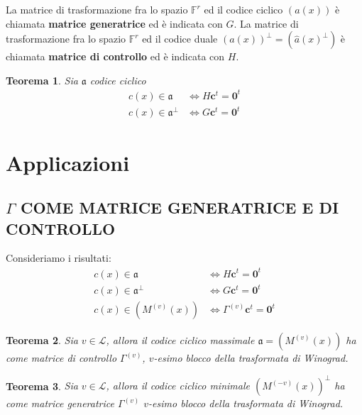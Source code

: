 \documentclass[mathserif]{beamer}
\newtheorem{teorema}{Teorema}
\begin{document}

\begin{frame}
  La matrice di trasformazione fra lo spazio $\mathbb{F}^{r}$ ed il codice ciclico $(a(x))$ è chiamata {\bf matrice generatrice} ed è indicata con $G$. 
  La matrice di trasformazione fra lo spazio $\mathbb{F}^{r}$ ed il codice duale $(a(x))^{\perp} = (\hat{a}(x)^{\perp})$ è chiamata {\bf matrice di controllo} ed è indicata con $H$.
  \begin{teorema}
     Sia $\mathfrak{a} $ codice ciclico 
     \begin{align*}
	c(x) \in \mathfrak{a} &\iff H \mathbf{c}^{t} = \mathbf{0}^{t}  \\
	c(x) \in \mathfrak{a}^{\perp} &\iff G \mathbf{c}^{t} = \mathbf{0}^{t} 
      \end{align*}
  \end{teorema}
\end{frame}


\section{Applicazioni}
\subsection{$\Gamma$ COME MATRICE GENERATRICE E DI CONTROLLO}
\begin{frame}
  Consideriamo i risultati:
      \begin{align*}
      c(x) \in \mathfrak{a} &\iff H \mathbf{c}^{t} = \mathbf{0}^{t}  \\
      c(x) \in \mathfrak{a}^{\perp} &\iff G \mathbf{c}^{t} = \mathbf{0}^{t} \\
      c(x) \in (M^{(v)}(x)) &\iff \Gamma^{(v)} \mathbf{c}^{t} = \mathbf{0}^{t}
    \end{align*}
   \begin{teorema}
      Sia $v \in \mathscr{L}$, allora il codice ciclico massimale $\mathfrak{a} = (M^{(v)}(x))$ ha come matrice di controllo $\Gamma^{(v)} $, $v$-esimo blocco della trasformata di Winograd. 
    \end{teorema}
    \begin{teorema}
      Sia $v \in \mathscr{L}$, allora il codice ciclico minimale $(M^{(-v)}(x))^{\perp}$ ha come matrice generatrice $\Gamma^{(v)} $ $v$-esimo blocco della trasformata di Winograd.
    \end{teorema}
\end{frame}
\end{document}
